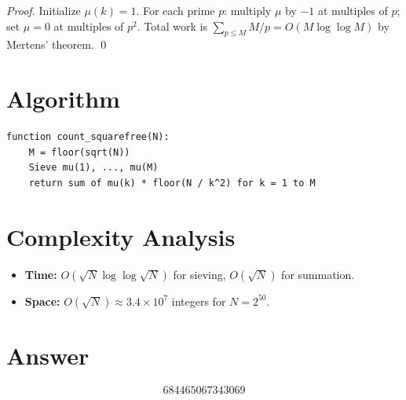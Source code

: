 \documentclass[12pt]{article}
\begin{document}
\begin{proof}
Initialize $\mu(k) = 1$. For each prime $p$: multiply $\mu$ by $-1$ at multiples of $p$; set $\mu = 0$ at multiples of $p^2$. Total work is $\sum_{p \leq M} M/p = O(M \log\log M)$ by Mertens' theorem. \qed
\end{proof}

\section{Algorithm}

\begin{verbatim}
function count_squarefree(N):
    M = floor(sqrt(N))
    Sieve mu(1), ..., mu(M)
    return sum of mu(k) * floor(N / k^2) for k = 1 to M
\end{verbatim}

\section{Complexity Analysis}

\begin{itemize}
    \item \textbf{Time:} $O(\sqrt{N} \log\log\sqrt{N})$ for sieving, $O(\sqrt{N})$ for summation.
    \item \textbf{Space:} $O(\sqrt{N}) \approx 3.4 \times 10^7$ integers for $N = 2^{50}$.
\end{itemize}

\section{Answer}

\[
\boxed{684465067343069}
\]
\end{document}
